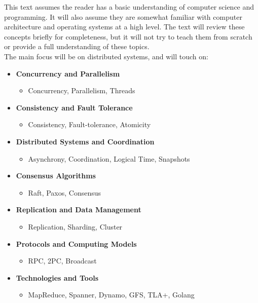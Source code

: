 \noindent
This text assumes the reader has a basic understanding of computer science and programming. It will also 
assume they are somewhat familiar with computer architecture and operating systems at a high level. The text 
will review these concepts briefly for completeness, but it will not try to teach them from scratch or provide a 
full understanding of these topics.\\

\noindent
The main focus will be on distributed systems, and will touch on:
\begin{itemize}
    \item \textbf{Concurrency and Parallelism}
    \begin{itemize}
        \item Concurrency, Parallelism, Threads
    \end{itemize}
    
    \item \textbf{Consistency and Fault Tolerance}
    \begin{itemize}
        \item Consistency, Fault-tolerance, Atomicity
    \end{itemize}
    
    \item \textbf{Distributed Systems and Coordination}
    \begin{itemize}
        \item Asynchrony, Coordination, Logical Time, Snapshots
    \end{itemize}
    
    \item \textbf{Consensus Algorithms}
    \begin{itemize}
        \item Raft, Paxos, Consensus
    \end{itemize}
    
    \item \textbf{Replication and Data Management}
    \begin{itemize}
        \item Replication, Sharding, Cluster
    \end{itemize}
    
    \item \textbf{Protocols and Computing Models}
    \begin{itemize}
        \item RPC, 2PC, Broadcast
    \end{itemize}
    
    \item \textbf{Technologies and Tools}
    \begin{itemize}
        \item MapReduce, Spanner, Dynamo, GFS, TLA+, Golang
    \end{itemize}
\end{itemize}
